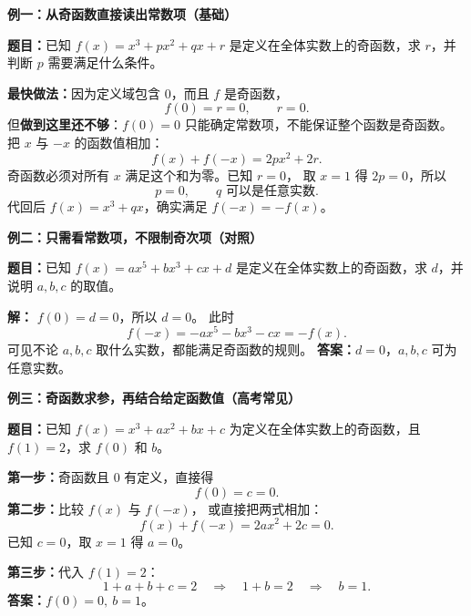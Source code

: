 \clearpage
\begin{examplebox}
  \textbf{\textcolor{CExample}{例一：从奇函数直接读出常数项（基础）}}



  \textbf{题目：}已知 $f(x)=x^3+px^2+qx+r$ 是定义在全体实数上的奇函数，求 $r$，并判断 $p$ 需要满足什么条件。

  \textbf{最快做法：}因为定义域包含 $0$，而且 $f$ 是奇函数，
  \[
    f(0)=r=0,\qquad\boxed{r=0}.
  \]
  但\textbf{做到这里还不够}：$f(0)=0$ 只能确定常数项，不能保证整个函数是奇函数。
  把 $x$ 与 $-x$ 的函数值相加：
  \[
    f(x)+f(-x)=2px^2+2r.
  \]
  奇函数必须对所有 $x$ 满足这个和为零。已知 $r=0$，
  取 $x=1$ 得 $2p=0$，所以
  \[
    \boxed{p=0},\qquad q\text{ 可以是任意实数}.
  \]
  代回后 $f(x)=x^3+qx$，确实满足 $f(-x)=-f(x)$。

  \medskip
  
\end{examplebox}
\clearpage
\begin{examplebox}
\textbf{\textcolor{CExample}{例二：只需看常数项，不限制奇次项（对照）}}



  \textbf{题目：}已知 $f(x)=ax^5+bx^3+cx+d$ 是定义在全体实数上的奇函数，求 $d$，并说明 $a,b,c$ 的取值。

  \textbf{解：} $f(0)=d=0$，所以 $\boxed{d=0}$。
  此时
  \[
    f(-x)=-ax^5-bx^3-cx=-f(x).
  \]
  可见不论 $a,b,c$ 取什么实数，都能满足奇函数的规则。
  \textbf{答案：}$d=0$，$a,b,c$ 可为任意实数。

  \medskip
  
\end{examplebox}
\clearpage
\begin{examplebox}
\textbf{\textcolor{CExample}{例三：奇函数求参，再结合给定函数值（高考常见）}}



  \textbf{题目：}已知 $f(x)=x^3+ax^2+bx+c$ 为定义在全体实数上的奇函数，且 $f(1)=2$，求 $f(0)$ 和 $b$。

  \textbf{第一步：}奇函数且 $0$ 有定义，直接得
  \[
    f(0)=c=0.
  \]
  \textbf{第二步：}比较 $f(x)$ 与 $f(-x)$，
  或直接把两式相加：
  \[
    f(x)+f(-x)=2ax^2+2c=0.
  \]
  已知 $c=0$，取 $x=1$ 得 $a=0$。

  \textbf{第三步：}代入 $f(1)=2$：
  \[
    1+a+b+c=2
    \quad\Longrightarrow\quad 1+b=2
    \quad\Longrightarrow\quad b=1.
  \]
  \textbf{答案：}$\boxed{f(0)=0,\ b=1}$。

  \medskip
  
\end{examplebox}
